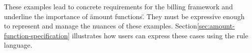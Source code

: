 These examples lead to concrete requirements for the billing framework and underline the importance of \"amount functions\".
They must be expressive enough to represent and manage the nuances of these examples.
Section\ref{sec:amount-function-specification} illustrates how users can express these cases using the rule language.
